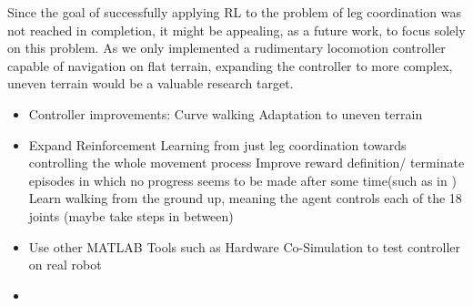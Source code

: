 Since the goal of successfully applying RL to the problem of leg coordination was not reached in completion, it might be appealing, as a future work, to focus solely on this problem.
As we only implemented a rudimentary locomotion controller capable of navigation on flat terrain, expanding the controller to more complex, uneven terrain would be a valuable research target.


\begin{itemize}
	
	\item Controller improvements:
		\subitem Curve walking
		\subitem Adaptation to uneven terrain
		\subitem 
	
	\item Expand Reinforcement Learning from just leg coordination towards controlling the whole movement process
		\subitem Improve reward definition/ terminate episodes in which no progress seems to be made after some time(such as in \cite{lillicrap2015continuous})
		\subitem Learn walking from the ground up, meaning the agent controls each of the 18 joints (maybe take steps in between)
		\subitem
	
	\item Use other MATLAB Tools such as Hardware Co-Simulation to test controller on real robot
	
	\item 
	
\end{itemize}